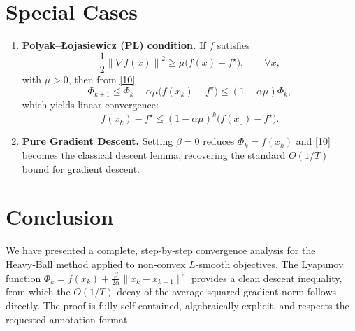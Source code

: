 \documentclass{article}
\newcommand{\norm}[1]{\left\lVert#1\right\rVert}
\begin{document}
\section*{Special Cases}
\begin{enumerate}[label=\arabic*)]
\item \textbf{Polyak–Łojasiewicz (PL) condition.}  If $f$ satisfies
\[
\frac{1}{2}\norm{\nabla f(x)}^{2}\ge\mu\bigl(f(x)-f^{\star}\bigr),\qquad\forall x,
\]
with $\mu>0$, then from \eqref{10}
\[
\Phi_{k+1}\le \Phi_{k} -\alpha\mu\bigl(f(x_{k})-f^{\star}\bigr)
\le (1-\alpha\mu)\Phi_{k},
\]
which yields linear convergence:
\[
f(x_{k})-f^{\star}\le (1-\alpha\mu)^{k}\bigl(f(x_{0})-f^{\star}\bigr).
\]
\item \textbf{Pure Gradient Descent.}  Setting $\beta=0$ reduces $\Phi_{k}=f(x_{k})$ and \eqref{10} becomes the classical descent lemma, recovering the standard $O(1/T)$ bound for gradient descent.
\end{enumerate}

\section*{Conclusion}
We have presented a complete, step‑by‑step convergence analysis for the Heavy‑Ball method applied to non‑convex $L$‑smooth objectives.  The Lyapunov function $\Phi_{k}=f(x_{k})+\frac{\beta}{2\alpha}\|x_{k}-x_{k-1}\|^{2}$ provides a clean descent inequality, from which the $O(1/T)$ decay of the average squared gradient norm follows directly.  The proof is fully self‑contained, algebraically explicit, and respects the requested annotation format.
\end{document}
